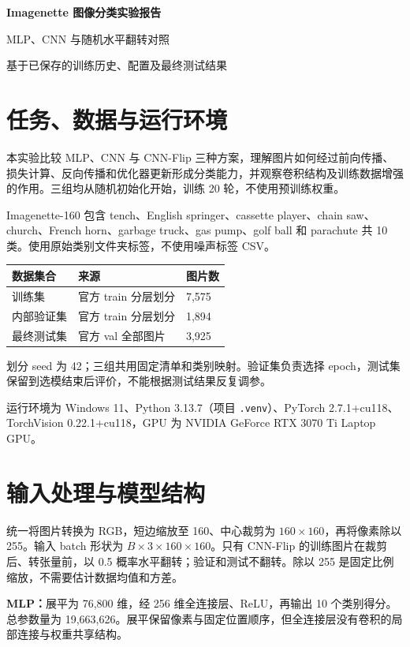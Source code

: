\documentclass[UTF8,a4paper,zihao=-4,fontset=windows]{ctexart}
\begin{document}
\begin{center}
{\LARGE\bfseries Imagenette 图像分类实验报告}\par
\vspace{5pt}
{\large MLP、CNN 与随机水平翻转对照}\par
{\small 基于已保存的训练历史、配置及最终测试结果}
\end{center}

\section{任务、数据与运行环境}
本实验比较 MLP、CNN 与 CNN-Flip 三种方案，理解图片如何经过前向传播、损失计算、反向传播和优化器更新形成分类能力，并观察卷积结构及训练数据增强的作用。三组均从随机初始化开始，训练 20 轮，不使用预训练权重。

Imagenette-160 包含 tench、English springer、cassette player、chain saw、church、French horn、garbage truck、gas pump、golf ball 和 parachute 共 10 类。使用原始类别文件夹标签，不使用噪声标签 CSV。

\begin{center}
\begin{tabular}{lll}
\toprule
数据集合 & 来源 & 图片数\\\midrule
训练集 & 官方 train 分层划分 & 7,575\\
内部验证集 & 官方 train 分层划分 & 1,894\\
最终测试集 & 官方 val 全部图片 & 3,925\\\bottomrule
\end{tabular}
\end{center}
划分 seed 为 42；三组共用固定清单和类别映射。验证集负责选择 epoch，测试集保留到选模结束后评价，不能根据测试结果反复调参。

运行环境为 Windows 11、Python 3.13.7（项目 \texttt{.venv}）、PyTorch 2.7.1+cu118、TorchVision 0.22.1+cu118，GPU 为 NVIDIA GeForce RTX 3070 Ti Laptop GPU。

\section{输入处理与模型结构}
统一将图片转换为 RGB，短边缩放至 160、中心裁剪为 $160\times160$，再将像素除以 255。输入 batch 形状为 $B\times3\times160\times160$。只有 CNN-Flip 的训练图片在裁剪后、转张量前，以 0.5 概率水平翻转；验证和测试不翻转。除以 255 是固定比例缩放，不需要估计数据均值和方差。

\textbf{MLP：}展平为 76,800 维，经 256 维全连接层、ReLU，再输出 10 个类别得分。总参数量为 19,663,626。展平保留像素与固定位置顺序，但全连接层没有卷积的局部连接与权重共享结构。
\end{document}
